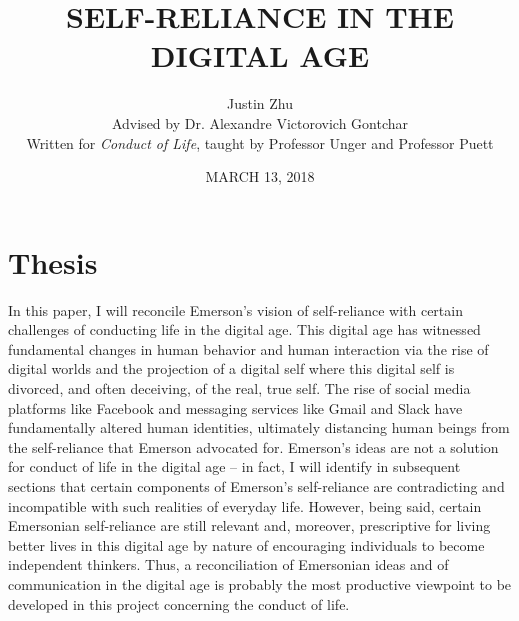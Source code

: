 \documentclass[12pt,letterpaper]{article}
\author{Justin Zhu \\ Advised by Dr. Alexandre Victorovich Gontchar \\ Written for \textit{Conduct of Life}, taught by Professor Unger and Professor Puett}
\title{SELF-RELIANCE IN THE DIGITAL AGE}
\date{MARCH 13, 2018}
\begin{document}
\pagestyle{empty}
\begin{titlepage}
\pagestyle{empty}
\maketitle
\pagestyle{empty}
\pagebreak
\tableofcontents
\end{titlepage}
\pagebreak
\pagestyle{plain}
\setcounter{page}{1}
\section{Thesis}
In this paper, I will reconcile Emerson's vision of
self-reliance with certain challenges of conducting life in the digital age.
This digital age has witnessed fundamental changes
in human behavior and human interaction via the rise of
digital worlds and the projection of a digital self where
this digital self is divorced, and often deceiving, of the real, true self.    The rise
of social media platforms like Facebook and messaging services like Gmail and Slack have fundamentally altered human identities, ultimately distancing human beings from the self-reliance that Emerson advocated for.  Emerson's ideas are not a solution for conduct of life in the digital age -- in fact, I will identify in subsequent sections that certain components of Emerson's self-reliance are contradicting and incompatible with such realities of everyday life.  However, being said, certain Emersonian self-reliance are still relevant and, moreover, prescriptive for living better lives in this digital age by nature of encouraging individuals to become independent thinkers.  Thus, a reconciliation of Emersonian ideas and of communication in the digital age is probably the most productive viewpoint to be developed in this project concerning the conduct of life.
\end{document}
